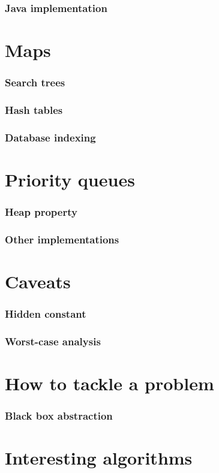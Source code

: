 \documentclass{beamer}
\begin{document}
\begin{frame}
 \frametitle{Java implementation}
\end{frame}

\section{Maps}

\begin{frame}
 \frametitle{Search trees}
\end{frame}

\begin{frame}
 \frametitle{Hash tables}
\end{frame}

\begin{frame}
 \frametitle{Database indexing}
\end{frame}

\section{Priority queues}

\begin{frame}
 \frametitle{Heap property}
\end{frame}

\begin{frame}
 \frametitle{Other implementations}
\end{frame}

\section{Caveats}

\begin{frame}
 \frametitle{Hidden constant}
\end{frame}

\begin{frame}
 \frametitle{Worst-case analysis}
\end{frame}

\section{How to tackle a problem}

\begin{frame}
 \frametitle{Black box abstraction}
\end{frame}

\section{Interesting algorithms}
\end{document}
